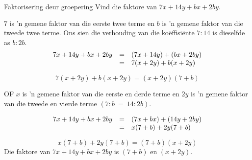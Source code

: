 \begin{wex}{Faktorisering deur groepering }{Vind die faktore van $7x+14y+bx+2by$.}
{


 $7$ is ’n gemene faktor van die eerste twee terme en $b$ is ’n gemene faktor van die tweede twee terme. Ons sien die verhouding van die ko\"effisi\"ente $7:14$ is dieselfde as $b:2b$.
\begin{equation*}
 \begin{array}{ccl}

7x+14y+bx+2by&=& (7x+14y)+(bx+2by)  \hfill\\ 
&=&7(x+2y)+b(x+2y) \hfill 
\end{array}
\end{equation*}


\begin{equation*}
7(x+2y)+b(x+2y)=(x+2y)(7+b)
\end{equation*}
% 
\par 
\large{OF}
% 
% 
% 
\setcounter{stepcounter}{1}
$x$ is 'n gemene faktor van die eerste en derde terme en $2y$ is 'n gemene faktor van die tweede en vierde terme $(7:b~=~14:2b)$.\par 
{}

\begin{equation*}
 \begin{array}{ccl}

7x+14y+bx+2by&=& (7x+bx)+(14y+2by)  \hfill\\ 
&=&x(7+b)+2y(7+b) \hfill 
\end{array}
\end{equation*}


\begin{equation*}
x(7+b)+2y(7+b) = (7+b)(x+2y)
\end{equation*}
Die faktore van $7x+14y+bx+2by$ is $(7+b)$ en $(x+2y)$.
}
\end{wex}


